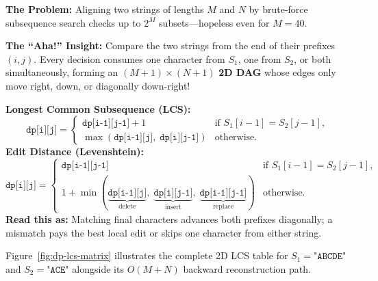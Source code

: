 \documentclass[11pt,a4paper]{article}
\theoremstyle{definition}
\newcommand{\painbeat}{\textbf{\color{accentamber}The Problem:} }
\newcommand{\ahabeat}{\textbf{\color{accentteal}The ``Aha!'' Insight:} }
\begin{document}
\painbeat Aligning two strings of lengths $M$ and $N$ by brute-force subsequence search checks up to $2^M$ subsets---hopeless even for $M = 40$.

\ahabeat Compare the two strings from the end of their prefixes $(i, j)$. Every decision consumes one character from $S_1$, one from $S_2$, or both simultaneously, forming an $(M+1) \times (N+1)$ \textbf{2D DAG} whose edges only move right, down, or diagonally down-right!

\begin{formulabox}
\textbf{Longest Common Subsequence (LCS):}
$$\texttt{dp[i][j]} = \begin{cases} \texttt{dp[i-1][j-1]} + 1 & \text{if } S_1[i-1] = S_2[j-1], \\ \max(\texttt{dp[i-1][j]},\; \texttt{dp[i][j-1]}) & \text{otherwise.} \end{cases}$$
\textbf{Edit Distance (Levenshtein):}
$$\texttt{dp[i][j]} = \begin{cases} \texttt{dp[i-1][j-1]} & \text{if } S_1[i-1] = S_2[j-1], \\ 1 + \min(\underbrace{\texttt{dp[i-1][j]}}_{\text{delete}},\; \underbrace{\texttt{dp[i][j-1]}}_{\text{insert}},\; \underbrace{\texttt{dp[i-1][j-1]}}_{\text{replace}}) & \text{otherwise.} \end{cases}$$
\textbf{Read this as:} Matching final characters advances both prefixes diagonally; a mismatch pays the best local edit or skips one character from either string.
\end{formulabox}

Figure~\ref{fig:dp-lcs-matrix} illustrates the complete 2D LCS table for $S_1 = \texttt{"ABCDE"}$ and $S_2 = \texttt{"ACE"}$ alongside its $O(M + N)$ backward reconstruction path.
\end{document}
